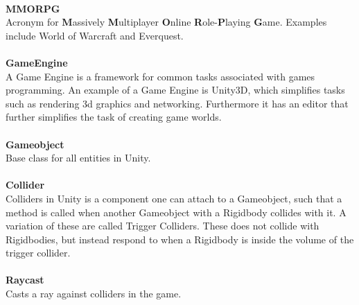 \\
\textbf{MMORPG}\vspace{4pt}\\
Acronym for \textbf{M}assively \textbf{M}ultiplayer \textbf{O}nline \textbf{R}ole-\textbf{P}laying \textbf{G}ame.
Examples include World of Warcraft and Everquest.\\
\\
\textbf{GameEngine}\vspace{4pt}\\
A Game Engine is a framework for common tasks associated with games programming.
An example of a Game Engine is Unity3D, which simplifies tasks such as rendering 3d graphics and networking.
Furthermore it has an editor that further simplifies the task of creating game worlds\cite{unityGameEngine}.\\
\\
\textbf{Gameobject}\vspace{4pt}\\
Base class for all entities in Unity.\cite{prefaceGameobject}\\
\\
\textbf{Collider}\vspace{4pt}\\
Colliders in Unity is a component one can attach to a Gameobject, such that a method is called when another Gameobject with a Rigidbody\cite{rigidbody} collides with it.\cite{collider2d}
A variation of these are called Trigger Colliders.
These does not collide with Rigidbodies, but instead respond to when a Rigidbody is inside the volume of the trigger collider.\cite{collider2dtrigger}\\
\\
\textbf{Raycast}\vspace{4pt}\\
Casts a ray against colliders in the game. \cite{raycast}\\